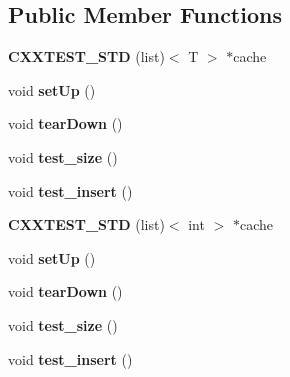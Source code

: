 \subsection*{Public Member Functions}
\begin{DoxyCompactItemize}
\item 
\hypertarget{classTests_a3c567c92b7e89cebaea1efd38ef59ff6}{{\bfseries C\-X\-X\-T\-E\-S\-T\-\_\-\-S\-T\-D} (list)$<$ T $>$ $\ast$cache}\label{classTests_a3c567c92b7e89cebaea1efd38ef59ff6}

\item 
\hypertarget{classTests_a6aff512703af4402af75821955332f56}{void {\bfseries set\-Up} ()}\label{classTests_a6aff512703af4402af75821955332f56}

\item 
\hypertarget{classTests_a3c1e5b676a31d3545693f01d1da4174a}{void {\bfseries tear\-Down} ()}\label{classTests_a3c1e5b676a31d3545693f01d1da4174a}

\item 
\hypertarget{classTests_a9b6e00b5941829080a4a8bcc0021db12}{void {\bfseries test\-\_\-size} ()}\label{classTests_a9b6e00b5941829080a4a8bcc0021db12}

\item 
\hypertarget{classTests_a492b61d666bd761cddcf532bbd4549ed}{void {\bfseries test\-\_\-insert} ()}\label{classTests_a492b61d666bd761cddcf532bbd4549ed}

\item 
\hypertarget{classTests_a76bb66df81ed2107ed8b37ead786a0ff}{{\bfseries C\-X\-X\-T\-E\-S\-T\-\_\-\-S\-T\-D} (list)$<$ int $>$ $\ast$cache}\label{classTests_a76bb66df81ed2107ed8b37ead786a0ff}

\item 
\hypertarget{classTests_a6aff512703af4402af75821955332f56}{void {\bfseries set\-Up} ()}\label{classTests_a6aff512703af4402af75821955332f56}

\item 
\hypertarget{classTests_a3c1e5b676a31d3545693f01d1da4174a}{void {\bfseries tear\-Down} ()}\label{classTests_a3c1e5b676a31d3545693f01d1da4174a}

\item 
\hypertarget{classTests_a9b6e00b5941829080a4a8bcc0021db12}{void {\bfseries test\-\_\-size} ()}\label{classTests_a9b6e00b5941829080a4a8bcc0021db12}

\item 
\hypertarget{classTests_a492b61d666bd761cddcf532bbd4549ed}{void {\bfseries test\-\_\-insert} ()}\label{classTests_a492b61d666bd761cddcf532bbd4549ed}


\end{DoxyCompactItemize}
